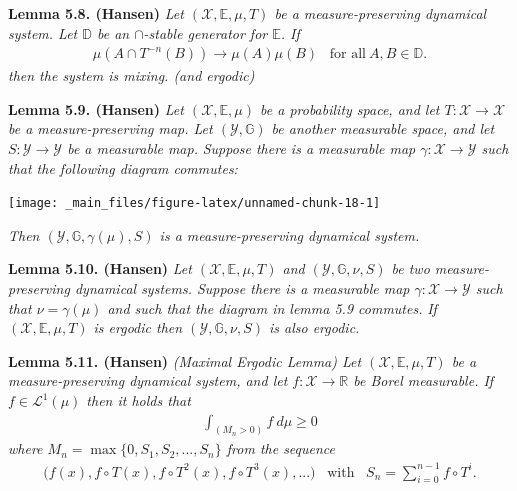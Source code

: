 \documentclass[
]{book}
\begin{document}
\textbf{Lemma 5.8. (Hansen)} \emph{Let \((\mathcal{X},\mathbb{E},\mu,T)\) be a measure-preserving dynamical system. Let \(\mathbb{D}\) be an \(\cap\)-stable generator for \(\mathbb{E}\). If}
\begin{align*}
        \mu(A\cap T^{-n}(B))\to \mu(A)\mu(B)\hspace{10pt}\text{for all}\ A,B\in\mathbb{D}.\tag{5.10}
\end{align*}
\emph{then the system is mixing. (and ergodic)}

\textbf{Lemma 5.9. (Hansen)} \emph{Let \((\mathcal{X},\mathbb{E},\mu)\) be a probability space, and let \(T : \mathcal{X}\to \mathcal{X}\) be a measure-preserving map. Let \((\mathcal{Y},\mathbb{G})\) be another measurable space, and let \(S : \mathcal{Y} \to \mathcal{Y}\) be a measurable map.}
\emph{Suppose there is a measurable map \(\gamma : \mathcal{X}\to \mathcal{Y}\) such that the following diagram commutes:}

\begin{center}\texttt{[image: \_main\_files/figure-latex/unnamed-chunk-18-1]} \end{center}

\emph{Then \((\mathcal{Y},\mathbb{G},\gamma(\mu),S)\) is a measure-preserving dynamical system.}

\textbf{Lemma 5.10. (Hansen)} \emph{Let \((\mathcal{X},\mathbb{E},\mu,T)\) and \((\mathcal{Y},\mathbb{G},\nu,S)\) be two measure-preserving dynamical systems. Suppose there is a measurable map \(\gamma : \mathcal{X}\to\mathcal{Y}\) such that \(\nu =\gamma(\mu)\) and such that the diagram in lemma 5.9 commutes.}
\emph{If \((\mathcal{X},\mathbb{E},\mu,T)\) is ergodic then \((\mathcal{Y},\mathbb{G},\nu,S)\) is also ergodic.}

\textbf{Lemma 5.11. (Hansen)} \emph{(Maximal Ergodic Lemma) Let \((\mathcal{X},\mathbb{E},\mu,T)\) be a measure-preserving dynamical system, and let \(f : \mathcal{X}\to \mathbb{R}\) be Borel measurable. If \(f\in \mathcal{L}^1(\mu)\) then it holds that}
\begin{align*}
    \int_{(M_n>0)}f\ d\mu\ge 0\tag{5.14}
\end{align*}
\emph{where \(M_n=\max\{0,S_1,S_2,...,S_n\}\) from the sequence}
\begin{align*}
    \Big(f(x), f\circ T(x),f\circ T^2(x),f\circ T^3(x),...\Big)\hspace{10pt}\text{with}\hspace{10pt}S_n=\sum_{i=0}^{n-1}f\circ T^i.
\end{align*}
\end{document}
